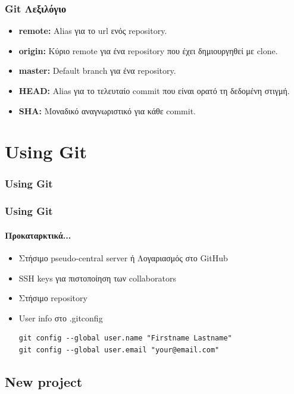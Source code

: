 \documentclass[]{beamer}
\begin{document}
\begin{frame}
  \frametitle{Git Λεξιλόγιο}
  \begin{itemize}
  \item \textbf{remote:} Alias για το url ενός repository.
  \item \textbf{origin:} Κύριο remote για ένα repository που έχει δημιουργηθεί
    με clone.
  \item \textbf{master:} Default branch για ένα repository.
  \item \textbf{HEAD:} Alias για το τελευταίο commit που είναι ορατό τη δεδομένη
    στιγμή. 
  \item \textbf{SHA:} Μοναδικό αναγνωριστικό για κάθε commit.
  \end{itemize}
\end{frame}

\section{Using Git}

\begin{frame}
  \frametitle{Using Git}
\end{frame}

\begin{frame}[fragile]
  \frametitle{Using Git}
  \framesubtitle{Προκαταρκτικά...}
  \begin{itemize}
    \item Στήσιμο pseudo-central server ή Λογαριασμός στο GitHub
    \item SSH keys για πιστοποίηση των collaborators
    \item Στήσιμο repository
    \item User info στο .gitconfig
\begin{verbatim}
git config --global user.name "Firstname Lastname"
git config --global user.email "your@email.com"
\end{verbatim}
  \end{itemize}
\end{frame}

\subsection{New project}
\end{document}
